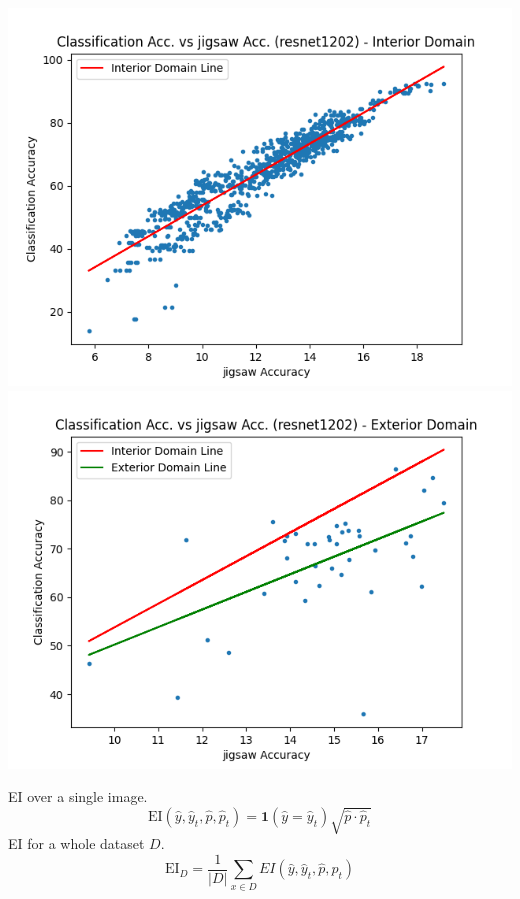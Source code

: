 \documentclass[a4paper]{article}
\begin{document}
{\begin{flushleft}
    \includegraphics[scale=0.16]{images/sample6.png}\includegraphics[scale=0.16]{images/sample7.png}

    \vspace{0.3cm}
    EI over a single image.
    \[
        \text{EI}(\hat{y},\hat{y}_t,\hat{p},\hat{p}_t) = \mathbf{1}(\hat{y}=\hat{y}_t)\sqrt{\hat{p}\cdot\hat{p}_t}
    \]
    EI for a whole dataset \(D\).
    \[
        \text{EI}_D = \frac{1}{|D|}\sum_{x \in D}EI(\hat{y},\hat{y}_t,\hat{p},\hat{p}_t)
    \]
    \end{flushleft}
}

\end{document}
